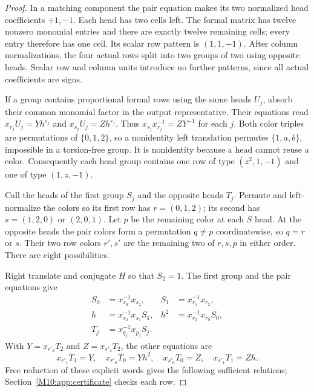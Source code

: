 \documentclass[11pt,a4paper,oneside]{report}
\theoremstyle{definition}
\theoremstyle{remark}
\begin{document}
\begin{proof}
In a matching component the pair equation makes its two normalized
head coefficients $+1,-1$. Each head has two cells left. The formal
matrix has twelve nonzero monomial entries and there are exactly
twelve remaining cells; every entry therefore has one cell.
Its scalar row pattern is $(1,1,-1)$. After column normalizations,
the four actual rows split into two groups of two using opposite
heads. Scalar row and column units introduce no further patterns,
since all actual coefficients are signs.

If a group contains proportional formal rows using the same heads
$U_j$, absorb their common monomial factor in the output representative.
Their equations read $x_{r_j}U_j=Yh^{e_j}$ and
$x_{s_j}U_j=Zh^{e_j}$. Thus $x_{s_j}x_{r_j}^{-1}=ZY^{-1}$
for each $j$. Both color triples are permutations of $\{0,1,2\}$,
so a nonidentity left translation permutes $\{1,a,b\}$, impossible
in a torsion-free group. It is nonidentity because a head cannot
reuse a color. Consequently each head group contains one row of
type $(z^2,1,-1)$ and one of type $(1,z,-1)$.

Call the heads of the first group $S_j$ and the opposite heads
$T_j$. Permute and left-normalize the colors so its first row has
$r=(0,1,2)$; its second has $s=(1,2,0)$ or $(2,0,1)$.
Let $p$ be the remaining color at each $S$ head. At the opposite
heads the pair colors form a permutation $q\ne p$ coordinatewise,
so $q=r$ or $s$. Their two row colors $r',s'$ are the remaining
two of $r,s,p$ in either order. There are eight possibilities.

Right translate and conjugate $H$ so that $S_2=1$. The first
group and the pair equations give
\begin{align*}
S_0&=x_{s_0}^{-1}x_{s_2},& S_1&=x_{r_1}^{-1}x_{r_2},\\
h&=x_{s_2}^{-1}x_{s_1}S_1,& h^2&=x_{r_2}^{-1}x_{r_0}S_0,\\
T_j&=x_{q_j}^{-1}x_{p_j}S_j.&&
\end{align*}
With $Y=x_{r'_2}T_2$ and $Z=x_{s'_2}T_2$, the other equations are
\[
x_{r'_1}T_1=Y,\quad x_{r'_0}T_0=Yh^2,\quad
x_{s'_0}T_0=Z,\quad x_{s'_1}T_1=Zh.
\]
Free reduction of these explicit words gives the following sufficient
relations; Section~\ref{M10:app:certificate} checks each row.


\end{proof}
\end{document}
